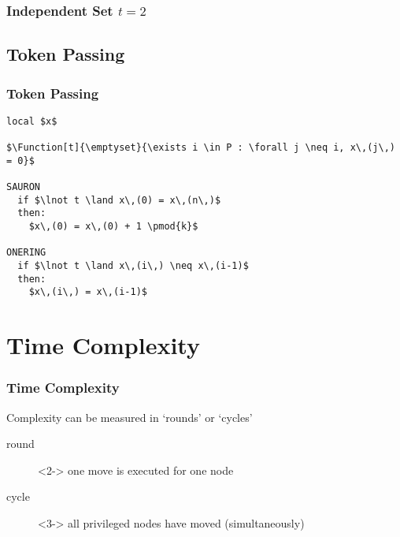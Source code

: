 \documentclass[
]{beamer}
\begin{document}
\begin{frame}
  \frametitle{Independent Set \qquad $t=2$}
  \centering
\end{frame}
\subsection{Token Passing}
\begin{frame}[fragile]
\frametitle{Token Passing}
\begin{lstlisting}[language=ssa]
local $x$

$\Function[t]{\emptyset}{\exists i \in P : \forall j \neq i, x\,(j\,) = 0}$

SAURON
  if $\lnot t \land x\,(0) = x\,(n\,)$
  then:
    $x\,(0) = x\,(0) + 1 \pmod{k}$

ONERING
  if $\lnot t \land x\,(i\,) \neq x\,(i-1)$
  then:
    $x\,(i\,) = x\,(i-1)$
\end{lstlisting}
\end{frame}
\section{Time Complexity}
\begin{frame}
  \frametitle{Time Complexity}
  Complexity can be measured in \enquote*{rounds} or \enquote*{cycles}

  \vfil

  \begin{description}
  \item[round]<2-> one move is executed for one node
  \item[cycle]<3-> all privileged nodes have moved (simultaneously)
  \end{description}
\end{frame}
\end{document}
